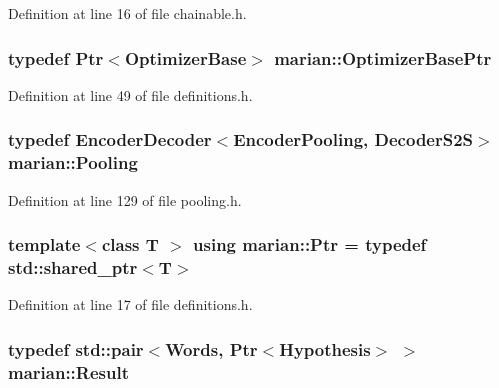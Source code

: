 Definition at line 16 of file chainable.\+h.

\subsubsection[{\texorpdfstring{Optimizer\+Base\+Ptr}{OptimizerBasePtr}}]{\setlength{\rightskip}{0pt plus 5cm}typedef {\bf Ptr}$<${\bf Optimizer\+Base}$>$ {\bf marian\+::\+Optimizer\+Base\+Ptr}}\hypertarget{namespacemarian_a63563426eab459d09fa044eb645c71e1}{}\label{namespacemarian_a63563426eab459d09fa044eb645c71e1}


Definition at line 49 of file definitions.\+h.

\subsubsection[{\texorpdfstring{Pooling}{Pooling}}]{\setlength{\rightskip}{0pt plus 5cm}typedef {\bf Encoder\+Decoder}$<${\bf Encoder\+Pooling}, {\bf Decoder\+S2S}$>$ {\bf marian\+::\+Pooling}}\hypertarget{namespacemarian_a9c309a030b3dc0b8fad7dfa3d584c3c1}{}\label{namespacemarian_a9c309a030b3dc0b8fad7dfa3d584c3c1}


Definition at line 129 of file pooling.\+h.

\subsubsection[{\texorpdfstring{Ptr}{Ptr}}]{\setlength{\rightskip}{0pt plus 5cm}template$<$class T $>$ using {\bf marian\+::\+Ptr} = typedef std\+::shared\+\_\+ptr$<$T$>$}\hypertarget{namespacemarian_ad1a373be43a00ef9ce35666145137b08}{}\label{namespacemarian_ad1a373be43a00ef9ce35666145137b08}


Definition at line 17 of file definitions.\+h.

\subsubsection[{\texorpdfstring{Result}{Result}}]{\setlength{\rightskip}{0pt plus 5cm}typedef std\+::pair$<${\bf Words}, {\bf Ptr}$<${\bf Hypothesis}$>$ $>$ {\bf marian\+::\+Result}}\hypertarget{namespacemarian_a39014b8d5e6a286ac891f3da661d6a46}{}\label{namespacemarian_a39014b8d5e6a286ac891f3da661d6a46}


